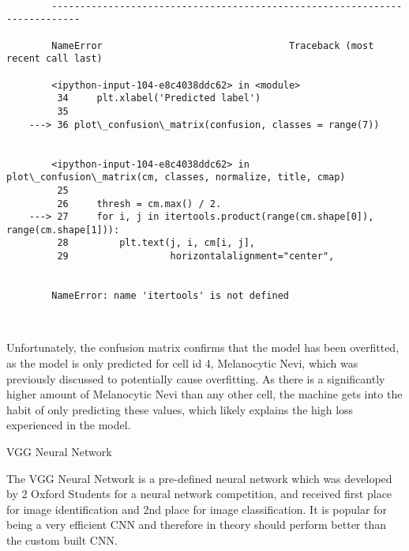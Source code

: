 \documentclass[11pt]{article}
\begin{document}
    \begin{Verbatim}[commandchars=\\\{\}]

        ---------------------------------------------------------------------------

        NameError                                 Traceback (most recent call last)

        <ipython-input-104-e8c4038ddc62> in <module>
         34     plt.xlabel('Predicted label')
         35 
    ---> 36 plot\_confusion\_matrix(confusion, classes = range(7))
    

        <ipython-input-104-e8c4038ddc62> in plot\_confusion\_matrix(cm, classes, normalize, title, cmap)
         25 
         26     thresh = cm.max() / 2.
    ---> 27     for i, j in itertools.product(range(cm.shape[0]), range(cm.shape[1])):
         28         plt.text(j, i, cm[i, j],
         29                  horizontalalignment="center",
    

        NameError: name 'itertools' is not defined

    \end{Verbatim}

    \begin{center}
    \end{center}
    { \hspace*{\fill} \\}
    
    Unfortunately, the confusion matrix confirms that the model has been
overfitted, as the model is only predicted for cell id 4, Melanocytic
Nevi, which was previously discussed to potentially cause overfitting.
As there is a significantly higher amount of Melanocytic Nevi than any
other cell, the machine gets into the habit of only predicting these
values, which likely explains the high loss experienced in the model.

    VGG Neural Network

The VGG Neural Network is a pre-defined neural network which was
developed by 2 Oxford Students for a neural network competition, and
received first place for image identification and 2nd place for image
classification. It is popular for being a very efficient CNN and
therefore in theory should perform better than the custom built CNN.
\end{document}
